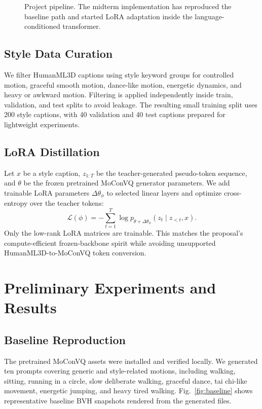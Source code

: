 \documentclass[conference]{IEEEtran}
\begin{document}
\begin{figure}[h]
\centering
{}
\caption{Project pipeline. The midterm implementation has reproduced the baseline path and started LoRA adaptation inside the language-conditioned transformer.}
\label{fig:pipeline}
\end{figure}

\subsection{Style Data Curation}
We filter HumanML3D captions using style keyword groups for controlled motion, graceful smooth motion, dance-like motion, energetic dynamics, and heavy or awkward motion. Filtering is applied independently inside train, validation, and test splits to avoid leakage. The resulting small training split uses 200 style captions, with 40 validation and 40 test captions prepared for lightweight experiments.

\subsection{LoRA Distillation}
Let $x$ be a style caption, $z_{1:T}$ be the teacher-generated pseudo-token sequence, and $\theta$ be the frozen pretrained MoConVQ generator parameters. We add trainable LoRA parameters $\Delta\theta_{\phi}$ to selected linear layers and optimize cross-entropy over the teacher tokens:
\begin{equation}
\mathcal{L}(\phi) =
- \sum_{t=1}^{T}\log p_{\theta+\Delta\theta_{\phi}}(z_t \mid z_{<t}, x).
\end{equation}
Only the low-rank LoRA matrices are trainable. This matches the proposal's compute-efficient frozen-backbone spirit while avoiding unsupported HumanML3D-to-MoConVQ token conversion.

\section{Preliminary Experiments and Results}
\subsection{Baseline Reproduction}
The pretrained MoConVQ assets were installed and verified locally. We generated ten prompts covering generic and style-related motions, including walking, sitting, running in a circle, slow deliberate walking, graceful dance, tai chi-like movement, energetic jumping, and heavy tired walking. Fig.~\ref{fig:baseline} shows representative baseline BVH snapshots rendered from the generated files.
\end{document}
